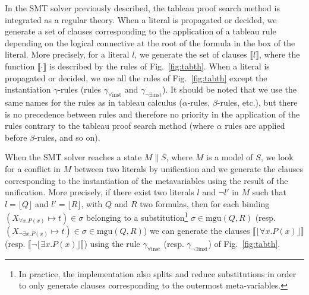 In the SMT solver previously described, the tableau proof search method is
integrated as a regular theory. When a literal is propagated or decided, we
generate a set of clauses corresponding to the application of a tableau rule
depending on the logical connective at the root of the formula in the box of the
literal. More precisely, for a literal $l$, we generate the set of clauses
$\llbracket{}l\rrbracket$, where the function $\llbracket\cdot\rrbracket$ is
described by the rules of Fig.~\ref{fig:tabth}. When a literal is propagated or
decided, we use all the rules of Fig.~\ref{fig:tabth} except the instantiation
$\gamma$-rules (rules $\gamma_{\forall\mathrm{inst}}$ and
$\gamma_{\neg\exists\mathrm{inst}}$). It should be noted that we use the same
names for the rules as in tableau calculus ($\alpha$-rules, $\beta$-rules,
etc.), but there is no precedence between rules and therefore no priority in the
application of the rules contrary to the tableau proof search method (where
$\alpha$ rules are applied before $\beta$-rules, and so on).

When the SMT solver reaches a state $M\parallel{}S$, where $M$ is a model of
$S$, we look for a conflict in $M$ between two literals by unification and we
generate the clauses corresponding to the instantiation of the metavariables
using the result of the unification. More precisely, if there exist two literals
$l$ and $\neg{}l'$ in $M$ such that $l=\lfloor{}Q\rfloor$ and
$l'=\lfloor{}R\rfloor$, with $Q$ and $R$ two formulas, then for each binding
$(X_{\forall{}x.P(x)}\mapsto{}t)\in\sigma$ belonging to a
substitution\footnote{In practice, the implementation also splits and
reduce substitutions in order to only generate clauses corresponding to the
outermost meta-variables.}
$\sigma\in\mathrm{mgu}(Q,R)$ (resp.
$(X_{\neg\exists{}x.P(x)}\mapsto{}t)\in\sigma\in\mathrm{mgu}(Q,R)$)
we can generate the clauses $\llbracket\lfloor\forall{}x.P(x)\rfloor{}\rrbracket$
(resp. $\llbracket\neg\lfloor\exists{}x.P(x)\rfloor{}\rrbracket$) using the rule
$\gamma_{\forall\mathrm{inst}}$ (resp. $\gamma_{\neg\exists\mathrm{inst}}$) of
Fig.~\ref{fig:tabth}.

